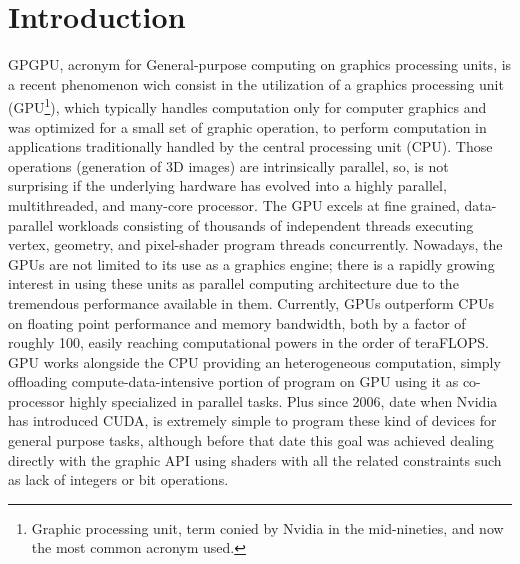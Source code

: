 \section{Introduction}
GPGPU, acronym for General-purpose computing on graphics processing units, is a
recent phenomenon wich consist in the utilization of a graphics processing unit
(GPU\footnote{Graphic processing unit, term conied by Nvidia in the
mid-nineties, and now the most common acronym used.}), which typically handles
computation only for computer graphics and was optimized for a small set of
graphic operation, to perform computation in applications traditionally handled
by the central processing unit (CPU). Those operations (generation of 3D images)
are intrinsically parallel, so, is not surprising if the underlying hardware has
evolved into a highly parallel, multithreaded, and many-core processor. The GPU excels at fine grained,
data-parallel workloads consisting of thousands of independent threads executing vertex,
geometry, and pixel-shader program threads concurrently.
Nowadays, the GPUs are not limited to its use as a graphics engine; there is a rapidly
growing interest in using these units as parallel computing architecture due to the tremendous
performance available in them. Currently, GPUs outperform CPUs on floating
point performance and memory bandwidth, both by a factor of roughly
100\cite{NvidiaprogGuide}, easily reaching computational powers in the
order of teraFLOPS. GPU works alongside the CPU providing an heterogeneous
computation, simply offloading compute-data-intensive portion of program on GPU
using it as co-processor highly specialized in parallel tasks.
Plus since 2006, date when Nvidia has introduced CUDA, is extremely simple to
program these kind of devices for general purpose tasks, although before that
date this goal was achieved dealing directly with the graphic API using shaders
with all the related constraints such as lack of integers or bit operations.



